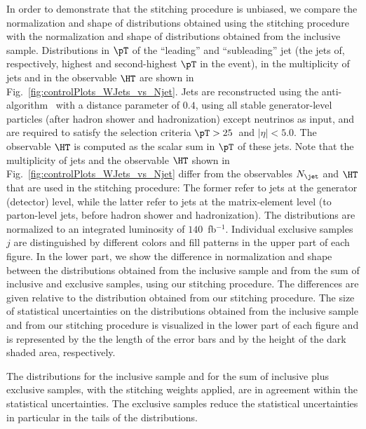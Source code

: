 In order to demonstrate that the stitching procedure is unbiased,
we compare the normalization and shape of distributions obtained using the stitching procedure with the normalization and shape of distributions obtained from the inclusive sample.
Distributions in $\pT$ of the ``leading'' and ``subleading'' jet (the jets of, respectively, highest and second-highest $\pT$ in the event),
in the multiplicity of jets and in the observable $\HT$ are shown in Fig.~\ref{fig:controlPlots_WJets_vs_Njet}.
Jets are reconstructed using the anti-\kt algorithm~\cite{Cacciari:2008gp,Cacciari:2011ma} with a distance parameter of $0.4$,
using all stable generator-level particles (after hadron shower and hadronization) except neutrinos as input, and are required to satisfy the selection criteria $\pT > 25$~\GeV and $\vert\eta\vert < 5.0$.
The observable $\HT$ is computed as the scalar sum in $\pT$ of these jets.
Note that the multiplicity of jets and the observable $\HT$ shown in Fig.~\ref{fig:controlPlots_WJets_vs_Njet} 
differ from the observables $N_{\jet}$ and $\HT$ that are used in the stitching procedure:
The former refer to jets at the generator (detector) level, while the latter refer to jets at the matrix-element level (\ie to parton-level jets, before hadron shower and hadronization).
The distributions are normalized to an integrated luminosity of $140$~fb$^{-1}$.
Individual exclusive samples $j$ are distinguished by different colors and fill patterns in the upper part of each figure.
In the lower part, we show the difference in normalization and shape between the distributions obtained from the inclusive sample and from the sum of inclusive and exclusive samples,
using our stitching procedure.
The differences are given relative to the distribution obtained from our stitching procedure.
The size of statistical uncertainties on the distributions obtained from the inclusive sample and from our stitching procedure
is visualized in the lower part of each figure and is represented by the the length of the error bars and by the height of the dark shaded area, respectively.

The distributions for the inclusive sample and for the sum of inclusive plus exclusive samples, with the stitching weights applied, are in agreement within the statistical uncertainties.
The exclusive samples reduce the statistical uncertainties in particular in the tails of the distributions.

